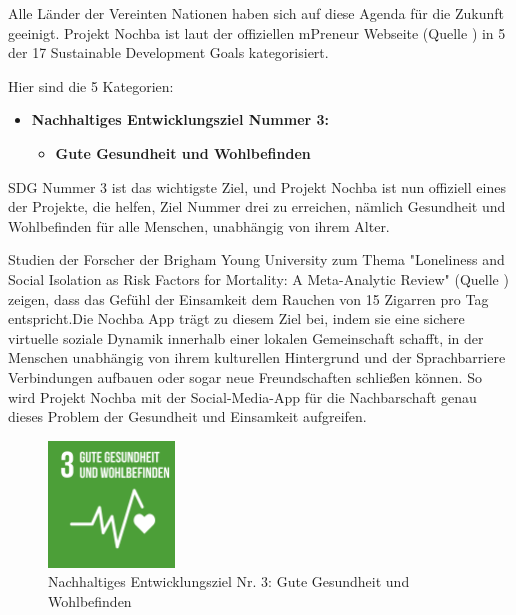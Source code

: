 Alle Länder der Vereinten Nationen haben sich auf diese Agenda für die Zukunft geeinigt. Projekt Nochba ist laut der offiziellen mPreneur Webseite (Quelle \cite{mPreneur-Website}) in 5 der 17 Sustainable Development Goals kategorisiert.

Hier sind die 5 Kategorien:

\begin{itemize}
    \item \textbf{Nachhaltiges Entwicklungsziel Nummer 3:}
          \begin{itemize}
              \item \textbf{Gute Gesundheit und Wohlbefinden}
          \end{itemize}
\end{itemize}

SDG Nummer 3 ist das wichtigste Ziel, und Projekt Nochba ist nun offiziell eines der Projekte, die helfen, Ziel Nummer drei zu erreichen, nämlich Gesundheit und Wohlbefinden für alle Menschen, unabhängig von ihrem Alter.

Studien der Forscher der Brigham Young University zum Thema "Loneliness and Social Isolation as Risk Factors for Mortality: A Meta-Analytic Review" (Quelle \cite{Loneliness-and-Social-Isolation}) zeigen, dass das Gefühl der Einsamkeit dem Rauchen von 15 Zigarren pro Tag entspricht.Die Nochba App trägt zu diesem Ziel bei, indem sie eine sichere virtuelle soziale Dynamik innerhalb einer lokalen Gemeinschaft schafft, in der Menschen unabhängig von ihrem kulturellen Hintergrund und der Sprachbarriere Verbindungen aufbauen oder sogar neue Freundschaften schließen können. So wird Projekt Nochba mit der Social-Media-App für die Nachbarschaft genau dieses Problem der Gesundheit und Einsamkeit aufgreifen.

\begin{figure}[H]
    \centering
    \includegraphics[width=0.3\textwidth]{pics/3-Gesundheit-und-Wohlbefinden.png}
    \caption{Nachhaltiges Entwicklungsziel Nr. 3: Gute Gesundheit und Wohlbefinden}
    \label{fig:SDG03}
\end{figure}

